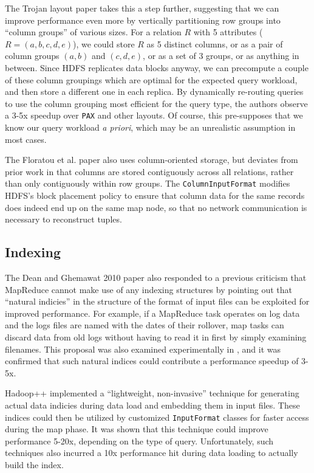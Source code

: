 \documentclass[twocolumn]{article}
\begin{document}
The Trojan layout paper takes this a step further, suggesting
that we can improve performance even more by vertically partitioning row groups into
``column groups'' of various sizes.  For a relation $R$ with 5 attributes
($R = (a, b, c, d, e)$), we could store $R$ as 5 distinct columns, or as a pair
of column groups $(a, b)$ and $(c, d, e)$, or as a set of 3 groups, or as anything
in between.  Since HDFS replicates data blocks anyway, we can precompute a couple
of these column groupings which are optimal for the expected query workload, 
and then store a different one in each replica.  By dynamically
re-routing queries to use the column grouping most efficient for the query type,
the authors observe a 3-5x speedup over \verb+PAX+ and other layouts.
Of course, this pre-supposes that we know our query workload \emph{a priori}, which
may be an unrealistic assumption in most cases.

The Floratou et al. paper also uses column-oriented storage,
but deviates from prior work in that columns are stored contiguously across all
relations, rather than only contiguously within row groups.  The \verb+ColumnInputFormat+
modifies HDFS's block placement policy to ensure that column data for the same
records does indeed end up on the same map node, so that no network communication
is necessary to reconstruct tuples.

\subsection{Indexing}

The Dean and Ghemawat 2010 paper also responded
to a previous criticism that MapReduce cannot make use of any indexing structures
by pointing out that ``natural indicies'' in the structure of the format of input
files can be exploited for improved performance.  For example, if a MapReduce
task operates on log data and the logs files are named with the dates of their
rollover, map tasks can discard data from old logs without having to read it 
in first by simply examining filenames.  This proposal was also examined
experimentally in \cite{ref:perf-study}, and it was confirmed that such
natural indices could contribute a performance speedup of 3-5x.

Hadoop++ \cite{ref:hadoop++} implemented a ``lightweight, non-invasive''
technique for generating actual data indicies during data load and embedding
them in input files.  These indices could then be utilized by customized
\verb+InputFormat+ classes for faster access during the map phase.  It was
shown that this technique could improve performance 5-20x, depending on
the type of query.  Unfortunately, such techniques also incurred a 10x
performance hit during data loading to actually build the index.
\end{document}

